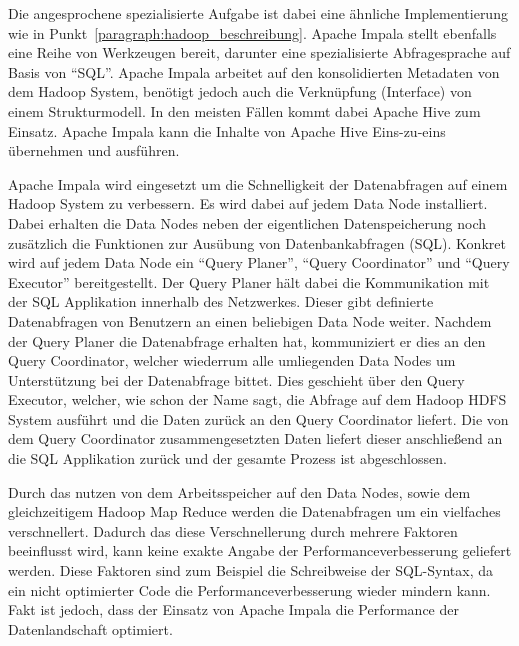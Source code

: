Die angesprochene spezialisierte Aufgabe ist dabei eine ähnliche
Implementierung wie in Punkt~\ref{paragraph:hadoop_beschreibung}. Apache Impala
stellt ebenfalls eine Reihe von Werkzeugen bereit, darunter eine spezialisierte
Abfragesprache auf Basis von ``SQL''. Apache Impala arbeitet auf den
konsolidierten Metadaten von dem Hadoop System, benötigt jedoch auch die
Verknüpfung (Interface) von einem Strukturmodell. In den meisten Fällen
kommt dabei Apache Hive zum Einsatz. Apache Impala kann die Inhalte von
Apache Hive Eins-zu-eins übernehmen und ausführen.

Apache Impala wird eingesetzt um die Schnelligkeit der Datenabfragen auf
einem Hadoop System zu verbessern. Es wird dabei auf jedem Data Node
installiert. Dabei erhalten die Data Nodes neben der eigentlichen
Datenspeicherung noch zusätzlich die Funktionen zur Ausübung von
Datenbankabfragen (SQL). Konkret wird auf jedem Data Node ein ``Query Planer'',
``Query Coordinator'' und ``Query Executor'' bereitgestellt. Der Query Planer
hält dabei die Kommunikation mit der SQL Applikation innerhalb des Netzwerkes.
Dieser gibt definierte Datenabfragen von Benutzern an einen beliebigen Data
Node weiter. Nachdem der Query Planer die Datenabfrage erhalten hat,
kommuniziert er dies an den Query Coordinator, welcher wiederrum alle
umliegenden Data Nodes um Unterstützung bei der Datenabfrage bittet.
Dies geschieht über den Query Executor, welcher, wie schon der Name sagt,
die Abfrage auf dem Hadoop HDFS System ausführt und die Daten zurück an den
Query Coordinator liefert. Die von dem Query Coordinator zusammengesetzten
Daten liefert dieser anschließend an die SQL Applikation zurück und der
gesamte Prozess ist abgeschlossen.

Durch das nutzen von dem Arbeitsspeicher auf den Data Nodes, sowie dem
gleichzeitigem Hadoop Map Reduce werden die Datenabfragen um ein vielfaches
verschnellert. Dadurch das diese Verschnellerung durch mehrere Faktoren
beeinflusst wird, kann keine exakte Angabe der Performanceverbesserung
geliefert werden. Diese Faktoren sind zum Beispiel die Schreibweise der
SQL-Syntax, da ein nicht optimierter Code die Performanceverbesserung
wieder mindern kann. Fakt ist jedoch, dass der Einsatz von Apache Impala
die Performance der Datenlandschaft optimiert.
\nl%

